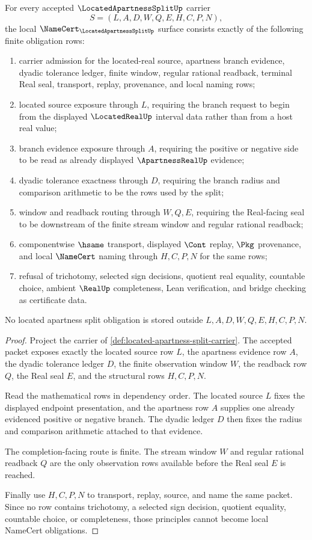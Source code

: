 \begin{theorem}
\label{thm:located-apartness-split-namecert-obligations}
For every accepted $\LocatedApartnessSplitUp$ carrier
$$
S=(L,A,D,W,Q,E,H,C,P,N),
$$
the local $\NameCert_{\LocatedApartnessSplitUp}$ surface consists exactly of the following finite obligation rows:
\begin{enumerate}
\item carrier admission for the located-real source, apartness branch evidence, dyadic tolerance ledger, finite window, regular rational readback, terminal Real seal, transport, replay, provenance, and local naming rows;
\item located source exposure through $L$, requiring the branch request to begin from the displayed $\LocatedRealUp$ interval data rather than from a host real value;
\item branch evidence exposure through $A$, requiring the positive or negative side to be read as already displayed $\ApartnessRealUp$ evidence;
\item dyadic tolerance exactness through $D$, requiring the branch radius and comparison arithmetic to be the rows used by the split;
\item window and readback routing through $W,Q,E$, requiring the Real-facing seal to be downstream of the finite stream window and regular rational readback;
\item componentwise $\hsame$ transport, displayed $\Cont$ replay, $\Pkg$ provenance, and local $\NameCert$ naming through $H,C,P,N$ for the same rows;
\item refusal of trichotomy, selected sign decisions, quotient real equality, countable choice, ambient $\RealUp$ completeness, Lean verification, and bridge checking as certificate data.
\end{enumerate}
No located apartness split obligation is stored outside $L,A,D,W,Q,E,H,C,P,N$.
\end{theorem}
\begin{proof}
Project the carrier of \autoref{def:located-apartness-split-carrier}. The accepted packet exposes exactly the located source row $L$, the apartness evidence row $A$, the dyadic tolerance ledger $D$, the finite observation window $W$, the readback row $Q$, the Real seal $E$, and the structural rows $H,C,P,N$.

Read the mathematical rows in dependency order. The located source $L$ fixes the displayed endpoint presentation, and the apartness row $A$ supplies one already evidenced positive or negative branch. The dyadic ledger $D$ then fixes the radius and comparison arithmetic attached to that evidence.

The completion-facing route is finite. The stream window $W$ and regular rational readback $Q$ are the only observation rows available before the Real seal $E$ is reached.

Finally use $H,C,P,N$ to transport, replay, source, and name the same packet. Since no row contains trichotomy, a selected sign decision, quotient equality, countable choice, or completeness, those principles cannot become local NameCert obligations.
\end{proof}


